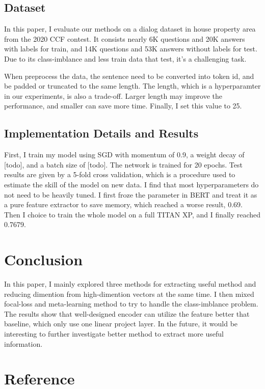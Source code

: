 \documentclass[10pt,twocolumn,letterpaper]{article}
\begin{document}
%
\subsection{Dataset}%

%
In this paper, I evaluate our methods on a dialog dataset in house property area from the 2020 CCF contest. It consists nearly 6K questions and 20K answers with labels for train, and 14K questions and 53K answers without labels for test. Due to its class{-}imblance and less train data that test, it's a challenging task.%

%
When preprocess the data, the sentence need to be converted into token id, and be padded or truncated to the same length. The length, which is a hyperparamter in our experiments, is also a trade{-}off. Larger length may improve the performance, and smaller can save more time. Finally, I set this value to 25.%

%

%
\subsection{Implementation Details and Results}%

%
First, I train my model using SGD with momentum of 0.9, a weight decay of {[}todo{]}, and a batch size of {[}todo{]}. The network is trained for 20 epochs. Test results are given by a 5{-}fold cross validation, which is a procedure used to estimate the skill of the model on new data. I find that most hyperparameters do not need to be heavily tuned. I first froze the parameter in BERT and treat it as a pure feature extractor to save memory, which reached a worse result, 0.69. Then I choice to train the whole model on a full TITAN XP, and I finally reached 0.7679.%

%

%
\section{Conclusion}%

%
In this paper, I mainly explored three methods for extracting useful method and reducing dimention from high{-}dimention vectors at the same time. I then mixed focal{-}loss and meta{-}learning method to try to handle the class{-}imblance problem. The results show that well{-}designed encoder can utilize the feature better that baseline, which only use one linear project layer. In the future, it would be interesting to further investigate better method to extract more useful information.%

%
\section{Reference}%


{\small


}
\end{document}
